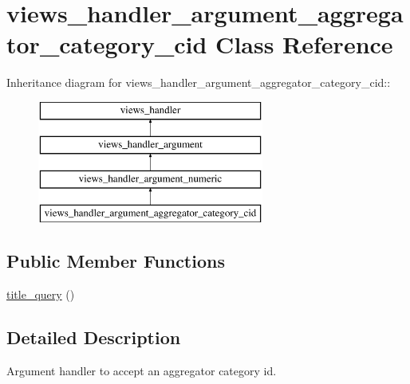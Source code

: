 \hypertarget{classviews__handler__argument__aggregator__category__cid}{
\section{views\_\-handler\_\-argument\_\-aggregator\_\-category\_\-cid Class Reference}
\label{classviews__handler__argument__aggregator__category__cid}
}
Inheritance diagram for views\_\-handler\_\-argument\_\-aggregator\_\-category\_\-cid::\begin{figure}[H]
\begin{center}
\leavevmode
\includegraphics[height=4cm]{classviews__handler__argument__aggregator__category__cid}
\end{center}
\end{figure}
\subsection*{Public Member Functions}
\begin{DoxyCompactItemize}
\item 
\hyperlink{classviews__handler__argument__aggregator__category__cid_aaaf79328b4ec709281563e275f9a7df2}{title\_\-query} ()
\end{DoxyCompactItemize}


\subsection{Detailed Description}
Argument handler to accept an aggregator category id. 


